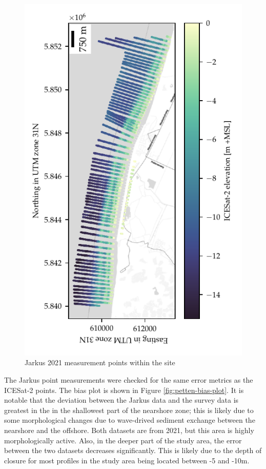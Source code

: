 \begin{figure}[h]
    \includegraphics[]{figures/Petten_photon_map.pdf}
    \caption{Jarkus 2021 measurement points within the site}
    \label{fig:jarkus-points}
\end{figure}

The Jarkus point measurements were checked for the same error metrics as the ICESat-2 points. The bias plot is shown in Figure \ref{fig:petten-bias-plot}. It is notable that the deviation between the Jarkus data and the survey data is greatest in the in the shallowest part of the nearshore zone; this is likely due to some morphological changes due to wave-drived sediment exchange between the nearshore and the offshore. Both datasets are from 2021, but this area is highly morphologically active. Also, in the deeper part of the study area, the error  between the two datasets decreases significantly. This is likely due to the depth of closure for most profiles in the study area being located between -5 and -10m. 

